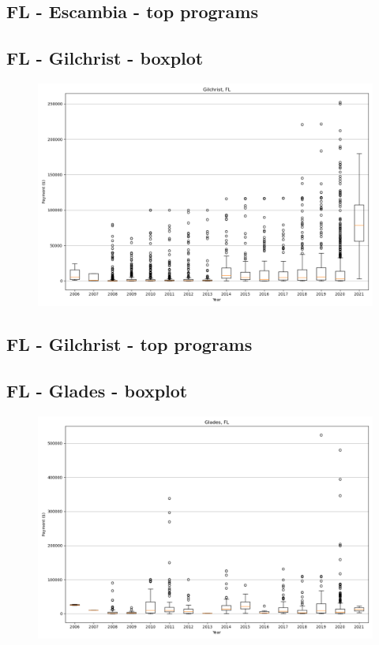 \subsection*{FL - Escambia - top programs}

\newpage
\subsection*{FL - Gilchrist - boxplot}
\begin{figure}[h]
\centering
\includegraphics[width=7in]{../output/boxplots/counties/Gilchrist-FL_boxplot.png}
\end{figure}


\subsection*{FL - Gilchrist - top programs}

\newpage
\subsection*{FL - Glades - boxplot}
\begin{figure}[h]
\centering
\includegraphics[width=7in]{../output/boxplots/counties/Glades-FL_boxplot.png}
\end{figure}


